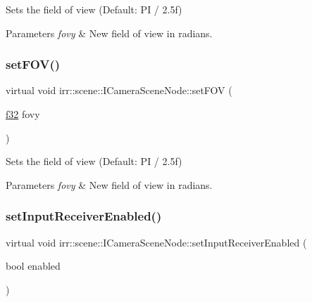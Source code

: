 Sets the field of view (Default\+: PI / 2.\+5f) 


\begin{DoxyParams}{Parameters}
{\em fovy} & New field of view in radians. \\
\hline
\end{DoxyParams}
\mbox{\label{classirr_1_1scene_1_1ICameraSceneNode_a43ee11523e9cf842d4b5d8c6a572241c}} 
\subsubsection{\texorpdfstring{set\+F\+O\+V()}{setFOV()}\hspace{0.1cm}{\footnotesize\ttfamily [2/2]}}
{\footnotesize\ttfamily virtual void irr\+::scene\+::\+I\+Camera\+Scene\+Node\+::set\+F\+OV (\begin{DoxyParamCaption}\item[{\hyperlink{namespaceirr_a0277be98d67dc26ff93b1a6a1d086b07}{f32}}]{fovy }\end{DoxyParamCaption})\hspace{0.3cm}{\ttfamily [pure virtual]}}



Sets the field of view (Default\+: PI / 2.\+5f) 


\begin{DoxyParams}{Parameters}
{\em fovy} & New field of view in radians. \\
\hline
\end{DoxyParams}
\mbox{\label{classirr_1_1scene_1_1ICameraSceneNode_a5b5c89233c1805676d6fcb392236dfec}} 
\subsubsection{\texorpdfstring{set\+Input\+Receiver\+Enabled()}{setInputReceiverEnabled()}\hspace{0.1cm}{\footnotesize\ttfamily [1/2]}}
{\footnotesize\ttfamily virtual void irr\+::scene\+::\+I\+Camera\+Scene\+Node\+::set\+Input\+Receiver\+Enabled (\begin{DoxyParamCaption}\item[{bool}]{enabled }\end{DoxyParamCaption})\hspace{0.3cm}{\ttfamily [pure virtual]}}



